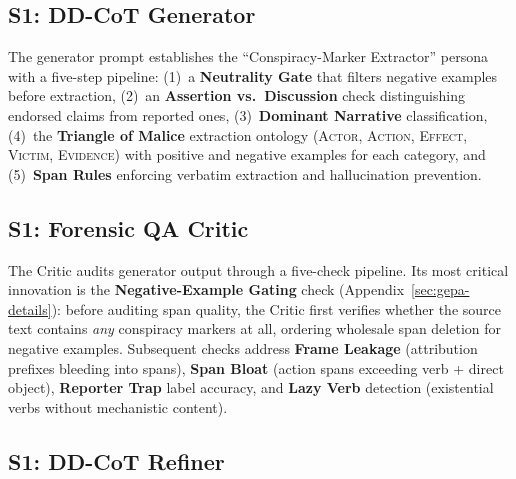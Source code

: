 \documentclass[11pt]{article}
\begin{document}
\subsection{S1: DD-CoT Generator}
\label{sec:prompt-generator}

The generator prompt establishes the ``Conspiracy-Marker Extractor'' persona
with a five-step pipeline: (1)~a \textbf{Neutrality Gate} that filters negative
examples before extraction, (2)~an \textbf{Assertion vs.\ Discussion} check
distinguishing endorsed claims from reported ones, (3)~\textbf{Dominant
	Narrative} classification, (4)~the \textbf{Triangle of Malice} extraction
ontology (\textsc{Actor}, \textsc{Action}, \textsc{Effect}, \textsc{Victim}, \textsc{Evidence}) with positive and negative
examples for each category, and (5)~\textbf{Span Rules} enforcing verbatim
extraction and hallucination prevention.





\subsection{S1: Forensic QA Critic}
\label{sec:prompt-critic}

The Critic audits generator output through a five-check pipeline. Its most
critical innovation is the \textbf{Negative-Example Gating} check
(Appendix~\ref{sec:gepa-details}): before auditing span quality, the Critic
first verifies whether the source text contains \emph{any} conspiracy markers
at all, ordering wholesale span deletion for negative examples. Subsequent
checks address \textbf{Frame Leakage} (attribution prefixes bleeding into
spans), \textbf{Span Bloat} (action spans exceeding verb + direct object),
\textbf{Reporter Trap} label accuracy, and \textbf{Lazy Verb} detection
(existential verbs without mechanistic content).





\subsection{S1: DD-CoT Refiner}
\label{sec:prompt-refiner}
\end{document}
